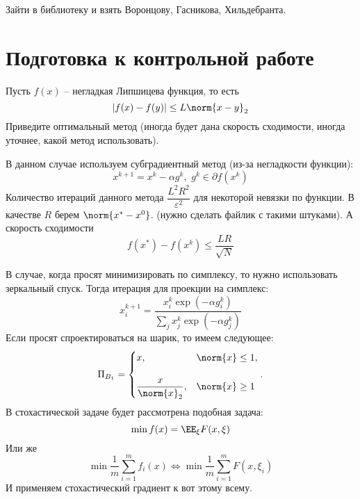 Зайти в библиотеку и взять Воронцову, Гасникова, Хильдебранта. 

\section{Подготовка к контрольной работе}

Пусть $f(x)$ -- негладкая Липшицева функция, то есть
\begin{equation*}
    |f(x) - f(y)| \leq L \norm{x - y}_2
\end{equation*}
Приведите оптимальный метод (иногда будет дана скорость сходимости, иногда уточнее, какой метод использовать).

В данном случае используем субградиентный метод (из-за негладкости функции):
\begin{equation*}
    x^{k + 1} = x^k - \alpha g^k, \, \, g^k \in \partial f(x^k)
\end{equation*}
Количество итераций данного метода $\dfrac{L^2 R^2}{\varepsilon^2}$ для некоторой невязки по функции. В качестве $R$ берем $\norm{x^* - x^0}$. (нужно сделать файлик с такими штуками). А скорость сходимости
\begin{equation*}
    f(x^*) - f(x^k) \leq \frac{LR}{\sqrt{N}}
\end{equation*}

В случае, когда просят минимизировать по симплексу, то нужно использовать зеркальный спуск. Тогда итерация для проекции на симплекс:
\begin{equation*}
    x^{k + 1}_i = \frac{x_i^k \exp(-\alpha g_i^k)}{\sum \limits_j x_j^k \exp (-\alpha g_j^k)}
\end{equation*}
Если просят спроектироваться на шарик, то имеем следующее:
\begin{equation*}
    \Pi_{B_1} = \begin{cases}
        x,& \norm{x} \leq 1,\\ \\
        \dfrac{x}{\norm{x}_2},& \norm{x} \geq 1
    \end{cases}.
\end{equation*}
В стохастической задаче будет рассмотрена подобная задача:
\begin{equation*}
    \min f(x) = \EE_{\xi} F(x, \xi)
\end{equation*}
Или же 
\begin{equation*}
    \min \frac{1}{m} \sum \limits_{i = 1}^m f_i(x) \iff \min \frac{1}{m} \sum \limits_{i = 1}^m F(x, \xi_i)
\end{equation*}
И применяем стохастический градиент к вот этому всему. 